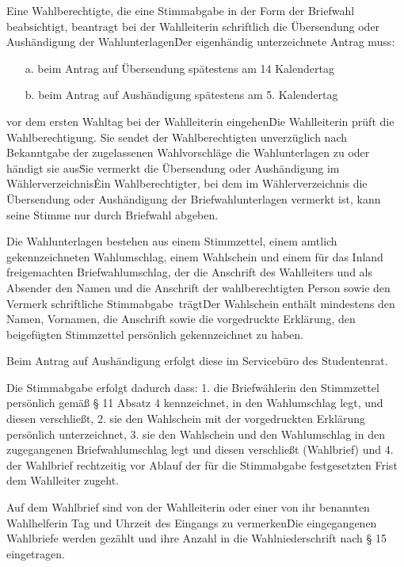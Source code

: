 \begin{multicols}{2}
\Abs \Satz Eine Wahlberechtigte, die eine Stimmabgabe in der Form der Briefwahl beabsichtigt, beantragt bei der Wahlleiterin schriftlich die Übersendung oder Aushändigung der Wahlunterlagen\. Der eigenhändig unterzeichnete Antrag muss:
\begin{itemize}
\item [a.] beim Antrag auf Übersendung spätestens am 14 Kalendertag
\item [b.] beim Antrag auf Aushändigung spätestens am 5. Kalendertag
\end {itemize}
vor dem ersten Wahltag bei der Wahlleiterin eingehen\. Die Wahlleiterin prüft die Wahlberechtigung. Sie sendet der Wahlberechtigten unverzüglich nach Bekanntgabe der zugelassenen Wahlvorschläge die Wahlunterlagen zu oder händigt sie aus\. Sie vermerkt die Übersendung oder Aushändigung im Wählerverzeichnis\. Ein Wahlberechtigter, bei dem im Wählerverzeichnis die Übersendung oder Aushändigung der Briefwahlunterlagen vermerkt ist, kann seine Stimme nur durch Briefwahl abgeben.

\Abs \Satz Die Wahlunterlagen bestehen aus einem Stimmzettel, einem amtlich gekennzeichneten Wahlumschlag, einem Wahlschein und einem für das Inland freigemachten Briefwahlumschlag, der die Anschrift des Wahlleiters und als Absender den Namen und die Anschrift der wahlberechtigten Person sowie den Vermerk \glqq schriftliche Stimmabgabe\grqq\, trägt\. Der Wahlschein enthält mindestens den Namen, Vornamen, die Anschrift sowie die vorgedruckte Erklärung, den beigefügten Stimmzettel persönlich gekennzeichnet zu haben.

\Abs \Satz Beim Antrag auf Aushändigung erfolgt diese im Servicebüro des Studentenrat.

\Abs \Satz Die Stimmabgabe erfolgt dadurch dass: 1. die Briefwählerin den Stimmzettel persönlich gemäß § 11 Absatz 4 kennzeichnet, in den Wahlumschlag legt, und diesen verschließt, 2. sie den Wahlschein mit der vorgedruckten Erklärung persönlich unterzeichnet, 3. sie den Wahlschein und den Wahlumschlag in den zugegangenen Briefwahlumschlag legt und diesen verschließt (Wahlbrief) und 4. der Wahlbrief rechtzeitig vor Ablauf der für die Stimmabgabe festgesetzten Frist dem Wahlleiter zugeht. %

\Abs \Satz Auf dem Wahlbrief sind von der Wahlleiterin oder einer von ihr benannten Wahlhelferin Tag und Uhrzeit des Eingangs zu vermerken\. Die eingegangenen Wahlbriefe werden gezählt und ihre Anzahl in die Wahlniederschrift nach § 15 eingetragen.


\end{multicols}
